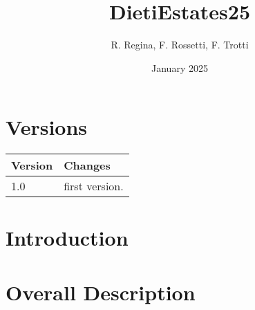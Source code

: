 \documentclass{article}
\author{R. Regina, F. Rossetti, F. Trotti}
\title{DietiEstates25}
\date{January 2025}
\begin{document}
\maketitle

\tableofcontents
\newpage

\section{Versions}
\begin{center}
\begin{tabular}{| m{8em} | m{8cm}|}
    \hline
    Version & Changes \\
    \hline
    1.0 & first version. \\
    \hline
\end{tabular}
\end{center}

\section{Introduction}


\section{Overall Description}

\end{document}
